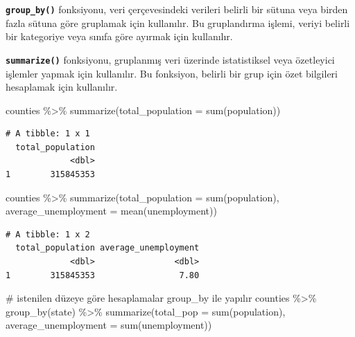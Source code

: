 \documentclass[
  letterpaper,
  DIV=11,
  numbers=noendperiod]{scrreprt}
\newenvironment{Shaded}{\begin{snugshade}}{\end{snugshade}}
\newcommand{\AttributeTok}[1]{\textcolor[rgb]{0.40,0.45,0.13}{#1}}
\newcommand{\CommentTok}[1]{\textcolor[rgb]{0.37,0.37,0.37}{#1}}
\newcommand{\FunctionTok}[1]{\textcolor[rgb]{0.28,0.35,0.67}{#1}}
\newcommand{\NormalTok}[1]{\textcolor[rgb]{0.00,0.23,0.31}{#1}}
\newcommand{\SpecialCharTok}[1]{\textcolor[rgb]{0.37,0.37,0.37}{#1}}
\begin{document}
\textbf{\texttt{group\_by()}} fonksiyonu, veri çerçevesindeki verileri
belirli bir sütuna veya birden fazla sütuna göre gruplamak için
kullanılır. Bu gruplandırma işlemi, veriyi belirli bir kategoriye veya
sınıfa göre ayırmak için kullanılır.

\textbf{\texttt{summarize()}} fonksiyonu, gruplanmış veri üzerinde
istatistiksel veya özetleyici işlemler yapmak için kullanılır. Bu
fonksiyon, belirli bir grup için özet bilgileri hesaplamak için
kullanılır.

\begin{Shaded}
\begin{Highlighting}[]
\NormalTok{counties }\SpecialCharTok{\%\textgreater{}\%}
\FunctionTok{summarize}\NormalTok{(}\AttributeTok{total\_population =} \FunctionTok{sum}\NormalTok{(population))}
\end{Highlighting}
\end{Shaded}

\begin{verbatim}
# A tibble: 1 x 1
  total_population
             <dbl>
1        315845353
\end{verbatim}

\begin{Shaded}
\begin{Highlighting}[]
\NormalTok{counties }\SpecialCharTok{\%\textgreater{}\%}
\FunctionTok{summarize}\NormalTok{(}\AttributeTok{total\_population =} \FunctionTok{sum}\NormalTok{(population),}
\AttributeTok{average\_unemployment =} \FunctionTok{mean}\NormalTok{(unemployment))}
\end{Highlighting}
\end{Shaded}

\begin{verbatim}
# A tibble: 1 x 2
  total_population average_unemployment
             <dbl>                <dbl>
1        315845353                 7.80
\end{verbatim}

\begin{Shaded}
\begin{Highlighting}[]
\CommentTok{\# istenilen düzeye göre hesaplamalar group\_by ile yapılır}
\NormalTok{counties }\SpecialCharTok{\%\textgreater{}\%}
\FunctionTok{group\_by}\NormalTok{(state) }\SpecialCharTok{\%\textgreater{}\%}
\FunctionTok{summarize}\NormalTok{(}\AttributeTok{total\_pop =} \FunctionTok{sum}\NormalTok{(population),}
\AttributeTok{average\_unemployment =} \FunctionTok{sum}\NormalTok{(unemployment))}
\end{Highlighting}
\end{Shaded}
\end{document}
